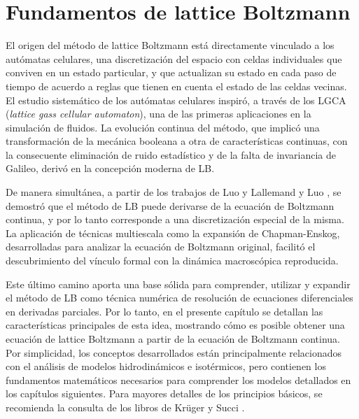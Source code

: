 \chapter{Fundamentos de lattice Boltzmann}
\label{chap:fundamentos}

El origen del m\'etodo de lattice Boltzmann est\'a directamente vinculado a los aut\'omatas celulares, una discretizaci\'on del espacio con celdas individuales que conviven en un estado particular, y que actualizan su estado en cada paso de tiempo de acuerdo a reglas que tienen en cuenta el estado de las celdas vecinas. El estudio sistem\'atico de los aut\'omatas celulares inspir\'o, a trav\'es de los LGCA (\emph{lattice gass cellular automaton}), una de las primeras aplicaciones en la simulaci\'on de fluidos. La evoluci\'on continua del m\'etodo, que implic\'o una transformaci\'on de la mec\'anica booleana a otra de caracter\'isticas continuas, con la consecuente eliminaci\'on de ruido estad\'istico y de la falta de invariancia de Galileo, deriv\'o en la concepci\'on moderna de LB.

De manera simult\'anea, a partir de los trabajos de Luo \cite{luo_unified_1998} y Lallemand y Luo \cite{lallemand_theory_2000}, se demostr\'o que el m\'etodo de LB puede derivarse de la ecuaci\'on de Boltzmann continua, y por lo tanto corresponde a una discretizaci\'on especial de la misma. La aplicaci\'on de t\'ecnicas multiescala como la expansi\'on de Chapman-Enskog, desarrolladas para analizar la ecuaci\'on de Boltzmann original, facilit\'o el descubrimiento del v\'inculo formal con la din\'amica macrosc\'opica reproducida.

Este \'ultimo camino aporta una base s\'olida para comprender, utilizar y expandir el m\'etodo de LB como t\'ecnica num\'erica de resoluci\'on de ecuaciones diferenciales en derivadas parciales. Por lo tanto, en el presente cap\'itulo se detallan las caracter\'isticas principales de esta idea, mostrando c\'omo es posible obtener una ecuaci\'on de lattice Boltzmann a partir de la ecuaci\'on de Boltzmann continua. Por simplicidad, los conceptos desarrollados est\'an principalmente relacionados con el an\'alisis de modelos hidrodin\'amicos e isot\'ermicos, pero contienen los fundamentos matem\'aticos necesarios para comprender los modelos detallados en los cap\'itulos siguientes. Para mayores detalles de los principios b\'asicos, se recomienda la consulta de los libros de Kr\"uger \cite{kruger_lattice_2017} y Succi \cite{succi_lattice_2018}.
\newpage

